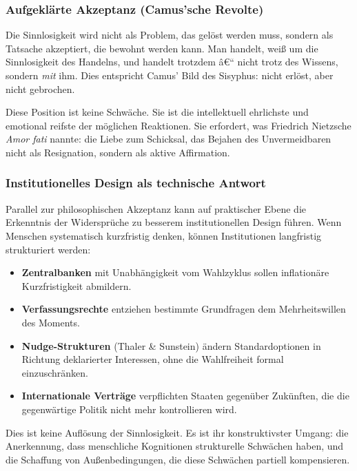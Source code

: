 ﻿\documentclass[12pt, a4paper]{article}
\begin{document}
\subsubsection{Aufgeklärte Akzeptanz (Camus'sche Revolte)}

Die Sinnlosigkeit wird nicht als Problem, das gelöst werden muss, sondern als
Tatsache akzeptiert, die bewohnt werden kann. Man handelt, weiß um die
Sinnlosigkeit des Handelns, und handelt trotzdem â€“ nicht trotz des Wissens,
sondern \emph{mit} ihm. Dies entspricht Camus' Bild des Sisyphus: nicht
erlöst, aber nicht gebrochen.

Diese Position ist keine Schwäche. Sie ist die intellektuell ehrlichste und
emotional reifste der möglichen Reaktionen. Sie erfordert, was Friedrich
Nietzsche \emph{Amor fati} nannte: die Liebe zum Schicksal, das Bejahen des
Unvermeidbaren nicht als Resignation, sondern als aktive Affirmation.

\subsubsection{Institutionelles Design als technische Antwort}

Parallel zur philosophischen Akzeptanz kann auf praktischer Ebene die
Erkenntnis der Widersprüche zu besserem institutionellen Design führen.
Wenn Menschen systematisch kurzfristig denken, können Institutionen
langfristig strukturiert werden:

\begin{itemize}
  \item \textbf{Zentralbanken} mit Unabhängigkeit vom Wahlzyklus sollen
    inflationäre Kurzfristigkeit abmildern.
  \item \textbf{Verfassungsrechte} entziehen bestimmte Grundfragen dem
    Mehrheitswillen des Moments.
  \item \textbf{Nudge-Strukturen} (Thaler \& Sunstein) ändern Standardoptionen
    in Richtung deklarierter Interessen, ohne die Wahlfreiheit formal einzuschränken.
  \item \textbf{Internationale Verträge} verpflichten Staaten gegenüber
    Zukünften, die die gegenwärtige Politik nicht mehr kontrollieren wird.
\end{itemize}

Dies ist keine Auflösung der Sinnlosigkeit. Es ist ihr konstruktivster Umgang:
die Anerkennung, dass menschliche Kognitionen strukturelle Schwächen haben,
und die Schaffung von Außenbedingungen, die diese Schwächen partiell kompensieren.
\end{document}
